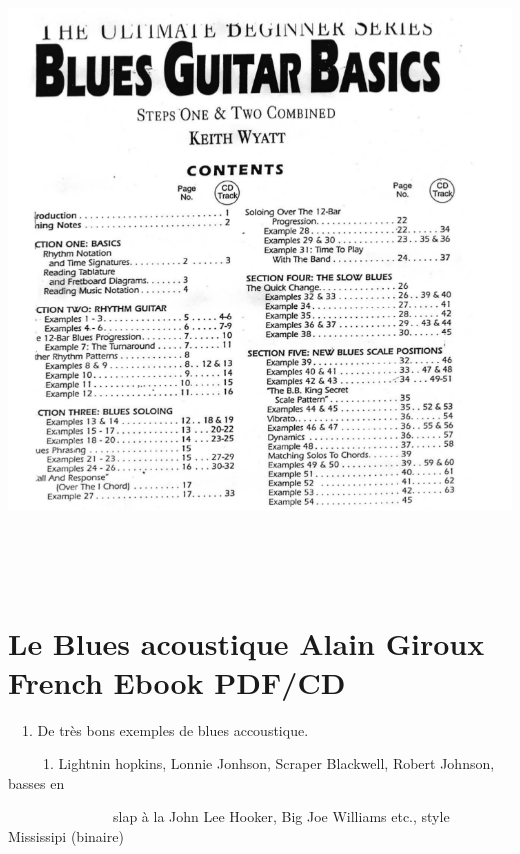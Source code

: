 \documentclass[a4paper]{book}
\begin{document}
\clearpage

\begin{center}
\includegraphics[width=17cm,height=16.953cm]{lebluessupportsmethodes-img114.png}
\end{center}





\clearpage\section[Le Blues acoustique Alain Giroux French Ebook
PDF/CD]{Le Blues acoustique Alain Giroux French Ebook PDF/CD}
\hypertarget{RefHeadingToc170973218262}{}\ \  1. De tr\`es bons exemples
de blues accoustique.

\ \  \ \ \ 1. Lightnin{\textquotesingle} hopkins, Lonnie Jonhson,
Scraper Blackwell, Robert Johnson, basses en

\ \ \ \ \ \ \ \ \ \ \ \ \ \ \ slap \`a la John Lee Hooker, Big Joe
Williams etc., style Mississipi (binaire)
\end{document}
